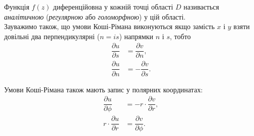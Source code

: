 Функція $f(z)$ диференційовна у кожній точці області $D$ називається \textit{аналітичною} (\textit{регулярною} або \textit{голоморфною}) у цій області. \\

Зауважимо також, що умови Коші-Рімана виконуються якщо замість $x$ і $y$ взяти довільні два перпендикулярні ($n = is$) напрямки $n$ і $s$, тобто
\begin{align}
	\label{eq:2.2.30}
	\dfrac{\partial u}{\partial s} &= \dfrac{\partial v}{\partial n}, \\
	\label{eq:2.2.31}
	\dfrac{\partial u}{\partial n} &= - \dfrac{\partial v}{\partial s}.
\end{align}

Умови Коші-Рімана також мають запис у полярних координатах:
\begin{align}
	\label{eq:2.2.32}
	\dfrac{\partial u}{\partial \phi} &= - r \cdot \dfrac{\partial v}{\partial r}, \\
	\label{eq:2.2.33}
	r \cdot \dfrac{\partial u}{\partial r} &= \dfrac{\partial v}{\partial \phi}.
\end{align}


% 